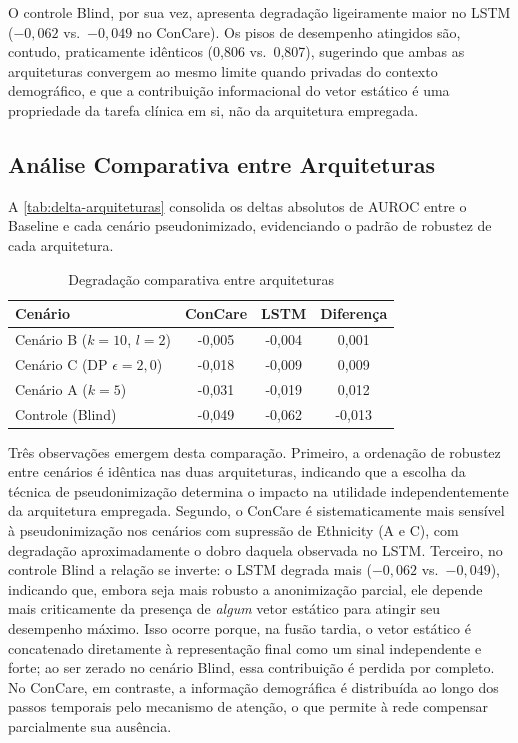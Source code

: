 O controle Blind, por sua vez, apresenta degradação ligeiramente maior no LSTM ($-0{,}062$ vs.\ $-0{,}049$ no ConCare). Os pisos de desempenho atingidos são, contudo, praticamente idênticos (0,806 vs.\ 0,807), sugerindo que ambas as arquiteturas convergem ao mesmo limite quando privadas do contexto demográfico, e que a contribuição informacional do vetor estático é uma propriedade da tarefa clínica em si, não da arquitetura empregada.

\subsection{Análise Comparativa entre Arquiteturas}
\label{sec:resultados-comparacao}

A \autoref{tab:delta-arquiteturas} consolida os deltas absolutos de AUROC entre o Baseline e cada cenário pseudonimizado, evidenciando o padrão de robustez de cada arquitetura.

\begin{table}[ht]
\centering
\caption{Degradação comparativa entre arquiteturas}
\label{tab:delta-arquiteturas}
\small
\begin{tabular}{l|c|c|c}
\hline
\textbf{Cenário} & \textbf{ConCare} & \textbf{LSTM} & \textbf{Diferença} \\ \hline
Cenário B ($k=10$, $l=2$)       & -0,005 & -0,004 & 0,001 \\
Cenário C (DP $\epsilon=2{,}0$) & -0,018 & -0,009 & 0,009 \\
Cenário A ($k=5$)               & -0,031 & -0,019 & 0,012 \\
Controle (Blind)                & -0,049 & -0,062 & -0,013 \\ \hline
\end{tabular}
\end{table}

Três observações emergem desta comparação. Primeiro, a ordenação de robustez entre cenários é idêntica nas duas arquiteturas, indicando que a escolha da técnica de pseudonimização determina o impacto na utilidade independentemente da arquitetura empregada. Segundo, o ConCare é sistematicamente mais sensível à pseudonimização nos cenários com supressão de Ethnicity (A e C), com degradação aproximadamente o dobro daquela observada no LSTM. Terceiro, no controle Blind a relação se inverte: o LSTM degrada mais ($-0{,}062$ vs.\ $-0{,}049$), indicando que, embora seja mais robusto a anonimização parcial, ele depende mais criticamente da presença de \textit{algum} vetor estático para atingir seu desempenho máximo. Isso ocorre porque, na fusão tardia, o vetor estático é concatenado diretamente à representação final como um sinal independente e forte; ao ser zerado no cenário Blind, essa contribuição é perdida por completo. No ConCare, em contraste, a informação demográfica é distribuída ao longo dos passos temporais pelo mecanismo de atenção, o que permite à rede compensar parcialmente sua ausência.

